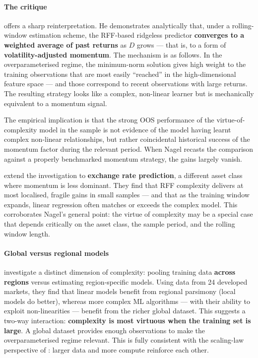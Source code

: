 \paragraph{The critique}

\cite{nagel2025seemingly} offers a sharp reinterpretation. He demonstrates analytically that, under a rolling-window estimation scheme, the RFF-based ridgeless predictor \textbf{converges to a weighted average of past returns} as $D$ grows --- that is, to a form of \textbf{volatility-adjusted momentum}. The mechanism is as follows. In the overparameterised regime, the minimum-norm solution gives high weight to the training observations that are most easily ``reached'' in the high-dimensional feature space --- and those correspond to recent observations with large returns. The resulting strategy looks like a complex, non-linear learner but is mechanically equivalent to a momentum signal.

The empirical implication is that the strong OOS performance of the virtue-of-complexity model in the \cite{kelly2024virtue} sample is not evidence of the model having learnt complex non-linear relationships, but rather coincidental historical success of the momentum factor during the relevant period. When Nagel recasts the comparison against a properly benchmarked momentum strategy, the gains largely vanish.

\cite{kilicc2025virtue} extend the investigation to \textbf{exchange rate prediction}, a different asset class where momentum is less dominant. They find that RFF complexity delivers at most localised, fragile gains in small samples --- and that as the training window expands, linear regression often matches or exceeds the complex model. This corroborates Nagel's general point: the virtue of complexity may be a special case that depends critically on the asset class, the sample period, and the rolling window length.

\paragraph{Global versus regional models}

\cite{chen2025model} investigate a distinct dimension of complexity: pooling training data \textbf{across regions} versus estimating region-specific models. Using data from 24 developed markets, they find that linear models benefit from regional parsimony (local models do better), whereas more complex ML algorithms --- with their ability to exploit non-linearities --- benefit from the richer global dataset. This suggests a two-way interaction: \textbf{complexity is most virtuous when the training set is large}. A global dataset provides enough observations to make the overparameterised regime relevant. This is fully consistent with the scaling-law perspective of \cite{timmermann2026compute}: larger data and more compute reinforce each other.


